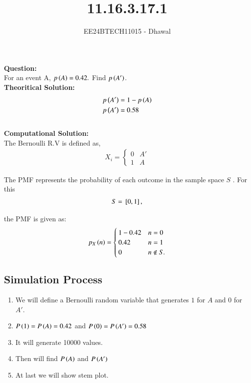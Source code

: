 \documentclass[journal]{IEEEtran}
\begin{document}

\vspace{3cm}

\title{11.16.3.17.1}
\author{EE24BTECH11015 - Dhawal}

{\let\newpage\relax\maketitle}

\renewcommand{\thefigure}{\theenumi}
\renewcommand{\thetable}{\theenumi}
\setlength{\intextsep}{10pt} %

\textbf{Question:}\\
For an event A, $p\left(A\right)=0.42.$ Find $p\left(A'\right)$.\\
	
	\textbf{Theoritical Solution:}
	\begin{align}
		p\left(A'\right)&=1-p\left(A\right)\\
        p\left(A'\right)&=0.58
	\end{align}\\
	\textbf{Computational Solution:}\\
	The Bernoulli R.V is defined as,
\begin{align}
	X_i = \begin{cases}
		0 & A'\\	
		1 & A	
	\end{cases}
\end{align}

    The PMF represents the probability of each outcome in the sample space $S$ . For this
\begin{align*}
    S = {}\left[0, 1\right],
\end{align*}

the PMF is given as:
\begin{align}
p_X\left(n\right) = \begin{cases}
    1-0.42 & n = 0\\
    0.42 & n = 1 \\ 
    0 & n \notin S.
\end{cases}
\end{align}

\subsection*{Simulation Process}
\begin{enumerate}
    \item We will define a Bernoulli random variable that generates $1$ for $A$ and $0$ for $A'$.
    \item $P\left(1\right)=P\left(A\right)=0.42$ and $P\left(0\right)=P\left(A'\right)=0.58$ 
    \item It will generate 10000 values.
    \item Then will find $P\left(A\right)$ and $P\left(A'\right)$
    \item At last we will show stem plot.
\end{enumerate}
\end{document}
